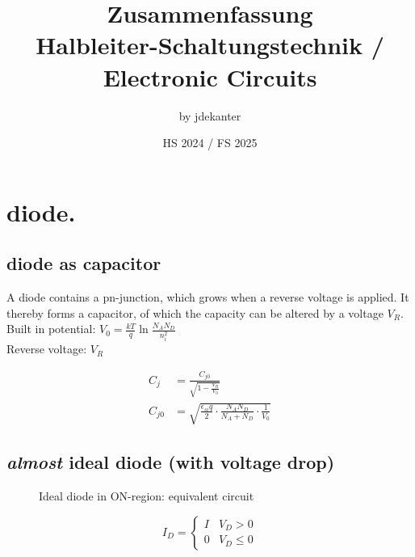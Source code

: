 \documentclass[11ypt]{extarticle}
\begin{document}
\title{Zusammenfassung \\
Halbleiter-Schaltungstechnik / Electronic Circuits}
\author{by jdekanter}
\date{HS 2024 / FS 2025}
\maketitle 

\section{diode.}

\subsection{diode as capacitor}

A diode contains a pn-junction, which grows when a reverse voltage is applied. It thereby forms a capacitor, of which the capacity can be altered by a voltage $V_R$.
\\
Built in potential: $V_0 = \frac{kT}{q} \ln\frac{N_A N_D}{n_i^2}$
\\
Reverse voltage: $V_R$

\begin{equation}
\begin{aligned}
C_{j} &= \frac{C_{j0}}{\sqrt{1-\frac{V_R}{V_0}}}
\\
C_{j0} &= \sqrt{\frac{\epsilon_{si} q}{2} \cdot \frac{N_A N_D}{N_A + N_D} \cdot \frac{1}{V_0}}
\end{aligned}
\end{equation}

\subsection{\textit{almost} ideal diode (with voltage drop)}

\begin{figure}[H]
    \centering
    
    \caption{Ideal diode in ON-region: equivalent circuit}
\end{figure}

\begin{equation}
    I_D = 
    \begin{cases}
        {I} & {V_D > 0} \\
        {0} & {V_D \leq 0}
    \end{cases}      
\end{equation}
\end{document}
